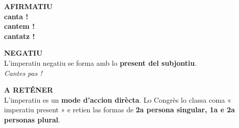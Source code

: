 \documentclass[a4paper,11pt]{article}
\begin{document}
\begin{minipage}{.91\textwidth}
\begin{minipage}{.485\textwidth}
\begin{neutralbox}[height=3.15cm]
\textbf{\color{NeutralDark}AFIRMATIU}\\[1mm]\centering
\textbf{canta !}\\
\textbf{cantem !}\\
\textbf{cantatz !}
\end{neutralbox}\end{minipage}\hfill
\begin{minipage}{.485\textwidth}\begin{warnbox}[height=3.15cm]
\textbf{\color{Red}NEGATIU}\\[1mm]
L'imperatiu negatiu se forma amb lo \textbf{present del subjontiu}.\\[1mm]
\textit{Cantes pas !}
\end{warnbox}\end{minipage}
\vspace{2mm}\begin{neutralbox}\textbf{\color{NeutralDark}A RETÉNER}\\[1mm]
L'imperatiu es un \textbf{mode d'accion dirècta}. Lo Congrès lo classa coma « imperatiu present » e retien las formas de \textbf{2a persona singular, 1a e 2a personas plural}.
\end{neutralbox}
\vspace{1.5mm}
\end{minipage}
\end{document}
